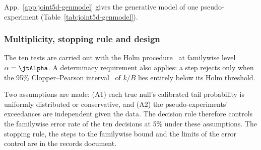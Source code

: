 App.~\ref{app:joint5d-genmodel} gives the generative model of one pseudo-experiment (Table~\ref{tab:joint5d-genmodel}).

\subsubsection{Multiplicity, stopping rule and design}
\label{sec:joint5d-frozen}

The ten tests are carried out with the Holm procedure~\cite{Holm:1979} at familywise level $\alpha=\jtAlpha$. A determinacy requirement also applies: a step rejects only when the 95\% Clopper--Pearson interval~\cite{Clopper:1934} of $k/B$ lies entirely below its Holm threshold.

Two assumptions are made: (A1) each true null's calibrated tail probability is uniformly distributed or conservative, and (A2) the pseudo-experiments' exceedances are independent given the data. The decision rule therefore controls the familywise error rate of the ten decisions at 5\% under these assumptions. The stopping rule, the steps to the familywise bound and the limits of the error control are in the records document.

